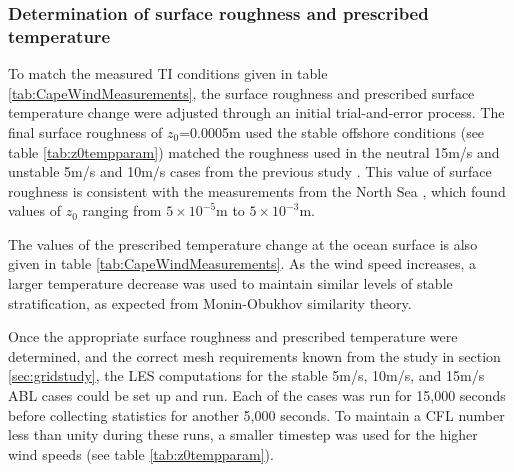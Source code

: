 \subsubsection{Determination of surface roughness and prescribed temperature }
To match the measured TI conditions given in table
\ref{tab:CapeWindMeasurements}, the surface roughness and prescribed
surface temperature change were adjusted through an initial
trial-and-error process.  The final surface roughness of $z_0$=0.0005m
used the stable offshore conditions (see table \ref{tab:z0tempparam})
matched the roughness used in the neutral 15m/s and unstable 5m/s and
10m/s cases from the previous study \cite{cheung2020large}.  This
value of surface roughness is consistent with the measurements from
the North Sea \cite{taylor2001dependence}, which found values of $z_0$
ranging from $5 \times 10^{-5}$m to $5\times 10^{-3}$m.

The values of the prescribed temperature change at the ocean surface
is also given in table \ref{tab:CapeWindMeasurements}.  As the wind
speed increases, a larger temperature decrease was used to maintain
similar levels of stable stratification, as expected from
Monin-Obukhov similarity theory.

Once the appropriate surface roughness and prescribed temperature were
determined, and the correct mesh requirements known from the study in
section \ref{sec:gridstudy}, the LES computations for the stable 5m/s,
10m/s, and 15m/s ABL cases could be set up and run.  Each of the cases
was run for 15,000 seconds before collecting statistics for another
5,000 seconds.  To maintain a CFL number less than unity during these
runs, a smaller timestep was used for the higher wind speeds (see
table \ref{tab:z0tempparam}).

